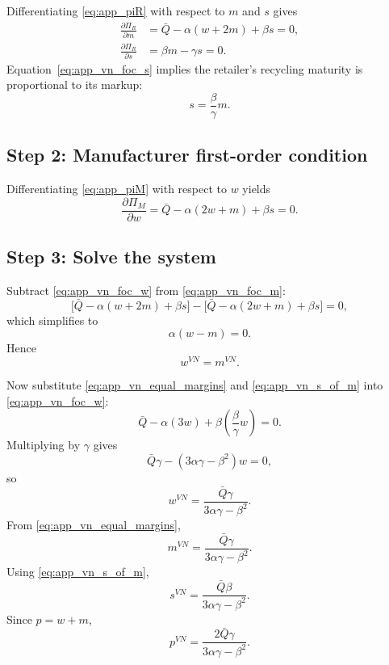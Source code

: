 Differentiating \eqref{eq:app_piR} with respect to $m$ and $s$ gives
\begin{align}
 \frac{\partial \Pi_R}{\partial m}
 &= \bar Q-\alpha(w+2m)+\beta s = 0,
 \label{eq:app_vn_foc_m}\\
 \frac{\partial \Pi_R}{\partial s}
 &= \beta m-\gamma s = 0.
 \label{eq:app_vn_foc_s}
\end{align}
Equation~\eqref{eq:app_vn_foc_s} implies the retailer's recycling maturity is
proportional to its markup:
\begin{equation}
 s=\frac{\beta}{\gamma}m.
 \label{eq:app_vn_s_of_m}
\end{equation}

\subsection{Step 2: Manufacturer first-order condition}

Differentiating \eqref{eq:app_piM} with respect to $w$ yields
\begin{equation}
 \frac{\partial \Pi_M}{\partial w}
 = \bar Q-\alpha(2w+m)+\beta s = 0.
 \label{eq:app_vn_foc_w}
\end{equation}

\subsection{Step 3: Solve the system}

Subtract \eqref{eq:app_vn_foc_w} from \eqref{eq:app_vn_foc_m}:
\begin{equation}
\bigl[\bar Q-\alpha(w+2m)+\beta s\bigr]-\bigl[\bar Q-\alpha(2w+m)+\beta s\bigr]=0,
\end{equation}
which simplifies to
\begin{equation}
 \alpha(w-m)=0.
\end{equation}
Hence
\begin{equation}
 w^{VN}=m^{VN}.
 \label{eq:app_vn_equal_margins}
\end{equation}

Now substitute \eqref{eq:app_vn_equal_margins} and
\eqref{eq:app_vn_s_of_m} into \eqref{eq:app_vn_foc_w}:
\begin{equation}
 \bar Q-\alpha(3w)+\beta\left(\frac{\beta}{\gamma}w\right)=0.
\end{equation}
Multiplying by $\gamma$ gives
\begin{equation}
 \bar Q\gamma-(3\alpha\gamma-\beta^2)w=0,
\end{equation}
so
\begin{equation}
 w^{VN}=\frac{\bar Q\gamma}{3\alpha\gamma-\beta^2}.
\end{equation}
From \eqref{eq:app_vn_equal_margins},
\begin{equation}
 m^{VN}=\frac{\bar Q\gamma}{3\alpha\gamma-\beta^2}.
\end{equation}
Using \eqref{eq:app_vn_s_of_m},
\begin{equation}
 s^{VN}=\frac{\bar Q\beta}{3\alpha\gamma-\beta^2}.
\end{equation}
Since $p=w+m$,
\begin{equation}
 p^{VN}=\frac{2\bar Q\gamma}{3\alpha\gamma-\beta^2}.
\end{equation}


